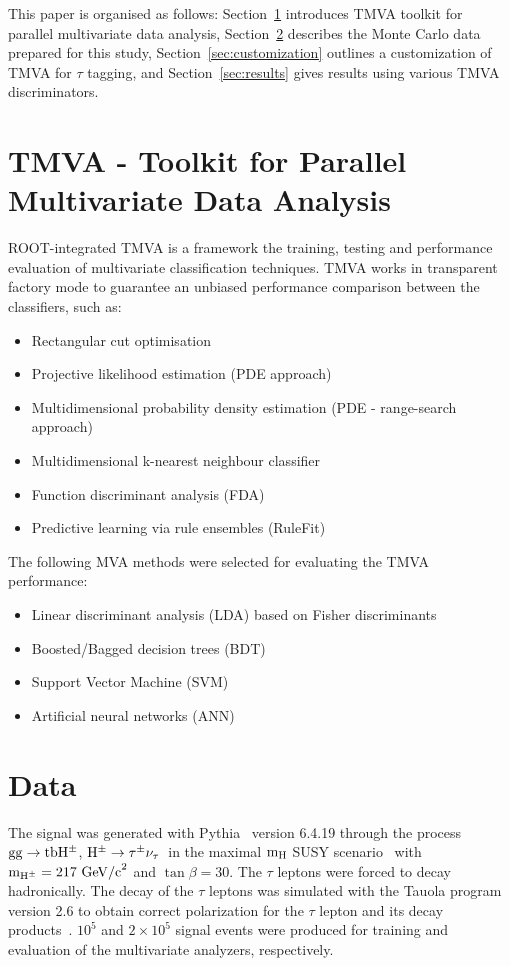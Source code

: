 \documentclass[a4paper]{jpconf}
\newcommand{\Hplustaunu}{\mbox{${\rm H}^{\pm} \to \tau^{\pm}\nu_{\tau}$}}
\begin{document}
This paper is organised as follows: Section~\ref{sec:tmva} introduces
TMVA toolkit for parallel multivariate data analysis,
Section~\ref{sec:data} describes the Monte Carlo data prepared for this study,
Section~\ref{sec:customization} outlines a customization of TMVA for $\tau$ tagging,
and Section~\ref{sec:results} gives results using various TMVA discriminators.

\section{TMVA - Toolkit for Parallel Multivariate Data Analysis}\label{sec:tmva}

ROOT-integrated TMVA is a framework the training, testing and performance evaluation
of multivariate classification techniques.
TMVA works in transparent factory mode 
to guarantee an unbiased performance comparison between the classifiers, such as:

\begin{itemize}
\item Rectangular cut optimisation
\item Projective likelihood estimation (PDE approach)
\item Multidimensional probability density estimation (PDE - range-search approach)
\item Multidimensional k-nearest neighbour classifier

\item Function discriminant analysis (FDA)
\item Predictive learning via rule ensembles (RuleFit)
\end{itemize}
 

\vspace{0.5cm}
The following MVA methods were selected for evaluating the TMVA performance:
\begin{itemize}
\item Linear discriminant analysis (LDA) based on Fisher discriminants
\item Boosted/Bagged decision trees (BDT)
\item Support Vector Machine (SVM) 
\item Artificial neural networks (ANN)
\end{itemize}


\section{Data}\label{sec:data}
The signal was generated with Pythia~\cite{pythia} version 6.4.19
through the process ${\rm gg} \to {\rm tbH^\pm}$,
\Hplustaunu\ in the maximal 
${\rm m}_{\rm H}$ SUSY scenario~\cite{maxsusy} with 
${\rm m}_{{\rm H}^{\pm}}=217~{\rm GeV/c}^2$ and $\tan\beta = 30$.
The $\tau$ leptons were forced to decay hadronically. The decay of the
$\tau$ leptons was simulated with the Tauola program~\cite{tauola}
version 2.6 to obtain correct polarization for the $\tau$ lepton and
its decay products~\cite{taupolarization}. $10^5$ and $2\times 10^5$
signal events were produced for training and evaluation of the
multivariate analyzers, respectively.
\end{document}
